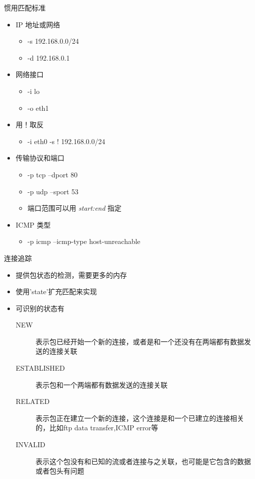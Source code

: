 \begin{frame}[shrink]{惯用匹配标准}
\begin{itemize}
\item IP 地址或网络

\begin{itemize}
\item -s 192.168.0.0/24
\item -d 192.168.0.1
\end{itemize}
\item 网络接口

\begin{itemize}
\item -i lo
\item -o eth1
\end{itemize}
\item 用！取反

\begin{itemize}
\item -i eth0 -s ! 192.168.0.0/24
\end{itemize}
\item 传输协议和端口

\begin{itemize}
\item -p tcp --dport 80
\item -p udp --sport 53
\item 端口范围可以用 \emph{start:end} 指定
\end{itemize}
\item ICMP 类型

\begin{itemize}
\item -p icmp --icmp-type host-unreachable
\end{itemize}
\end{itemize}

\end{frame} 
 \begin{frame}{连接追踪}
\begin{itemize}
\item 提供包状态的检测，需要更多的内存
\item 使用'state'扩充匹配来实现
\item 可识别的状态有

\begin{description}
\item [{NEW}] 表示包已经开始一个新的连接，或者是和一个还没有在两端都有数据发送的连接关联
\item [{ESTABLISHED}] 表示包和一个两端都有数据发送的连接关联
\item [{RELATED}] 表示包正在建立一个新的连接，这个连接是和一个已建立的连接相关的，比如ftp data transfer,ICMP
error等
\item [{INVALID}] 表示这个包没有和已知的流或者连接与之关联，也可能是它包含的数据或者包头有问题
\end{description}
\end{itemize}

\end{frame} 
